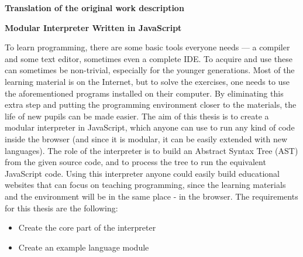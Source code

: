 \begin{center}
\large
\textbf{Translation of the original work description}\\
\end{center}

\begin{center}
\Huge
\textbf{Modular Interpreter Written in JavaScript}\\
\end{center}

To learn programming, there are some basic tools everyone needs --- a compiler and some text editor, sometimes even a complete IDE. To acquire and use these can sometimes be non-trivial, especially for the younger generations. Most of the learning material is on the Internet, but to solve the exercises, one needs to use the aforementioned programs installed on their computer. By eliminating this extra step and putting the programming environment closer to the materials, the life of new pupils can be made easier. The aim of this thesis is to create a modular interpreter in JavaScript, which anyone can use to run any kind of code inside the browser (and since it is modular, it can be easily extended with new languages). The role of the interpreter is to build an Abstract Syntax Tree (AST) from the given source code, and to process the tree to run the equivalent JavaScript code. Using this interpreter anyone could easily build educational websites that can focus on teaching programming, since the learning materials and the environment will be in the same place - in the browser.
The requirements for this thesis are the following:
\begin{itemize}
\item Create the core part of the interpreter
\item Create an example language module
\end{itemize}

\cleardoublepage